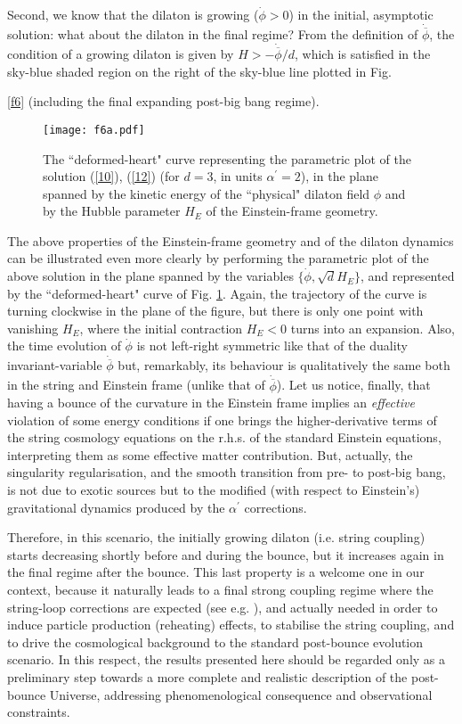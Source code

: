\documentclass[a4paper,11pt]{article}
\def \fp {{\dot{\phi}}}
\def \ap {\alpha^{\prime}}
\def \fb {\overline \phi}
\def \fbp {\dot{\fb}}
\begin{document}
Second, we know that the dilaton is growing ($\fp>0$) in the initial, asymptotic solution: what about the dilaton in the final regime? From the definition of $\fbp$, the condition of a growing dilaton is given by $H>-\fbp/d$, which is satisfied in the sky-blue shaded region on the right of the sky-blue line plotted in Fig. {\ref{f6} (including the final expanding post-big bang regime). 



\begin{figure}[b]
\centering
\texttt{[image: f6a.pdf]}
\caption{The ``deformed-heart" curve representing the parametric plot of the solution (\ref{10}), (\ref{12}) (for $d=3$, in units $\ap=2$), in the plane spanned by the  kinetic energy of the ``physical" dilaton field $\phi$ and by the Hubble parameter $H_E$ of the Einstein-frame geometry.}
\label{f6a}
\end{figure}

The above properties of the Einstein-frame geometry and of the dilaton dynamics can be illustrated even more clearly by performing the parametric plot of the above solution in the plane spanned by the variables $\{\dot \phi, \sqrt{d} H_E\}$, and represented by the ``deformed-heart" curve of Fig. \ref{f6a}. Again, the trajectory of the curve is turning clockwise in the plane of the figure, but there is only one point with vanishing $H_E$, where the initial contraction $H_E<0$ turns into an expansion. Also, the time evolution of $\dot \phi$ is not 
left-right symmetric like that of the duality invariant-variable $\fbp$ but, remarkably, its behaviour is qualitatively the same both in the string and Einstein frame (unlike that of $\fbp$). 
Let us notice, finally, that having a bounce of the curvature in the Einstein frame implies an {\it effective} violation of some energy conditions if one brings the higher-derivative terms of the string cosmology equations on the r.h.s. of the standard Einstein equations,  interpreting them as some effective matter contribution. But, actually, the singularity regularisation, and the smooth transition from pre- to post-big bang, is not due to exotic sources but to the modified (with respect to Einstein's) gravitational dynamics produced by the $\ap$ corrections.

Therefore, in this scenario, the initially growing dilaton (i.e. string coupling) starts decreasing shortly before and during the bounce, but it increases again in the final regime after the bounce. This last property is a welcome one in our context, because it naturally leads to a final strong coupling regime where the string-loop corrections are expected (see e.g. \cite{9}), and actually needed in order to induce particle production (reheating) effects, to stabilise the string coupling, and to drive the cosmological background to the standard post-bounce evolution scenario. In this respect, the results presented here should be regarded only as a preliminary step towards a more complete and realistic description of the post-bounce Universe, addressing phenomenological consequence and observational constraints.


}
\end{document}
